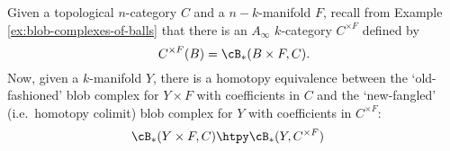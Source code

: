 \begin{thm} \label{product_thm}
Given a topological $n$-category $C$ and a $n{-}k$-manifold $F$, recall from 
Example \ref{ex:blob-complexes-of-balls} that there is an  $A_\infty$ $k$-category $C^{\times F}$ defined by
\begin{equation*}
C^{\times F}(B) = \cB_*(B \times F, C).
\end{equation*}
Now, given a $k$-manifold $Y$, there is a homotopy equivalence between the `old-fashioned' 
blob complex for $Y \times F$ with coefficients in $C$ and the `new-fangled' 
(i.e.\ homotopy colimit) blob complex for $Y$ with coefficients in $C^{\times F}$:
\begin{align*}
\cB_*(Y \times F, C) & \htpy \cB_*(Y, C^{\times F})
\end{align*}
\end{thm}


